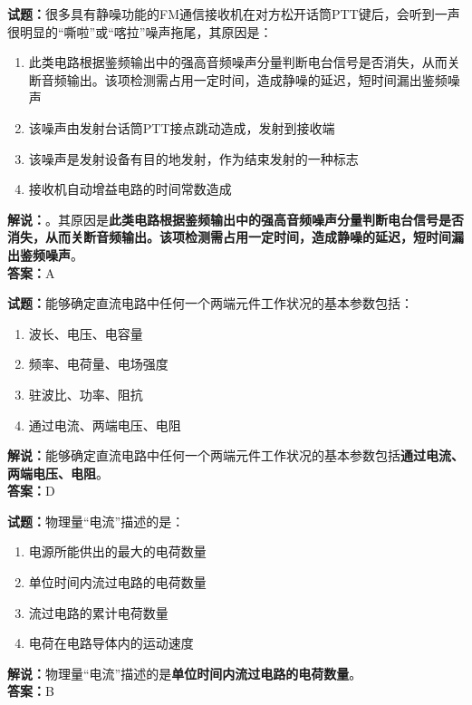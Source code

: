 \documentclass{ctexbook}
\begin{document}
\vspace{1em}

\textbf{试题：}很多具有静噪功能的FM通信接收机在对方松开话筒PTT键后，会听到一声很明显的“嘶啦”或“喀拉”噪声拖尾，其原因是：
\begin{enumerate}[leftmargin=3em]
  \item 此类电路根据鉴频输出中的强高音频噪声分量判断电台信号是否消失，从而关断音频输出。该项检测需占用一定时间，造成静噪的延迟，短时间漏出鉴频噪声
  \item 该噪声由发射台话筒PTT接点跳动造成，发射到接收端
  \item 该噪声是发射设备有目的地发射，作为结束发射的一种标志
  \item 接收机自动增益电路的时间常数造成
\end{enumerate}
\noindent\textbf{解说：}。其原因是\textbf{此类电路根据鉴频输出中的强高音频噪声分量判断电台信号是否消失，从而关断音频输出。该项检测需占用一定时间，造成静噪的延迟，短时间漏出鉴频噪声}。\\\noindent\textbf{答案：}A

\vspace{1em}

\textbf{试题：}能够确定直流电路中任何一个两端元件工作状况的基本参数包括：
\begin{enumerate}[leftmargin=3em]
  \item 波长、电压、电容量
  \item 频率、电荷量、电场强度
  \item 驻波比、功率、阻抗
  \item 通过电流、两端电压、电阻
\end{enumerate}
\noindent\textbf{解说：}能够确定直流电路中任何一个两端元件工作状况的基本参数包括\textbf{通过电流、两端电压、电阻}。\\\noindent\textbf{答案：}D

\vspace{1em}

\textbf{试题：}物理量“电流”描述的是：
\begin{enumerate}[leftmargin=3em]
  \item 电源所能供出的最大的电荷数量
  \item 单位时间内流过电路的电荷数量
  \item 流过电路的累计电荷数量
  \item 电荷在电路导体内的运动速度
\end{enumerate}
\noindent\textbf{解说：}物理量“电流”描述的是\textbf{单位时间内流过电路的电荷数量}。\\\noindent\textbf{答案：}B
\end{document}
